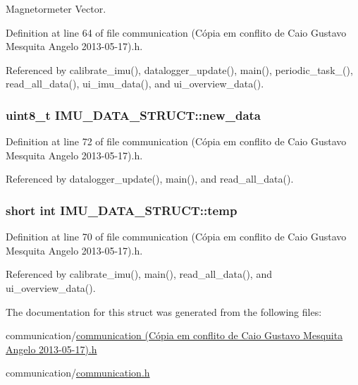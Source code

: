 Magnetormeter Vector. 



Definition at line 64 of file communication (\-Cópia em conflito de Caio Gustavo Mesquita Angelo 2013-\/05-\/17).\-h.



Referenced by calibrate\-\_\-imu(), datalogger\-\_\-update(), main(), periodic\-\_\-task\-\_(), read\-\_\-all\-\_\-data(), ui\-\_\-imu\-\_\-data(), and ui\-\_\-overview\-\_\-data().

\hypertarget{structIMU__DATA__STRUCT_a99924252176326418863e511d4fa437b}{
\subsubsection[{new\-\_\-data}]{\setlength{\rightskip}{0pt plus 5cm}uint8\-\_\-t I\-M\-U\-\_\-\-D\-A\-T\-A\-\_\-\-S\-T\-R\-U\-C\-T\-::new\-\_\-data}}\label{structIMU__DATA__STRUCT_a99924252176326418863e511d4fa437b}


Definition at line 72 of file communication (\-Cópia em conflito de Caio Gustavo Mesquita Angelo 2013-\/05-\/17).\-h.



Referenced by datalogger\-\_\-update(), main(), and read\-\_\-all\-\_\-data().

\hypertarget{structIMU__DATA__STRUCT_a81e1dbf765c1d947ca6076aa1bbc73e7}{
\subsubsection[{temp}]{\setlength{\rightskip}{0pt plus 5cm}short int I\-M\-U\-\_\-\-D\-A\-T\-A\-\_\-\-S\-T\-R\-U\-C\-T\-::temp}}\label{structIMU__DATA__STRUCT_a81e1dbf765c1d947ca6076aa1bbc73e7}


Definition at line 70 of file communication (\-Cópia em conflito de Caio Gustavo Mesquita Angelo 2013-\/05-\/17).\-h.



Referenced by calibrate\-\_\-imu(), main(), read\-\_\-all\-\_\-data(), and ui\-\_\-overview\-\_\-data().



The documentation for this struct was generated from the following files\-:\begin{DoxyCompactItemize}
\item 
communication/\hyperlink{communication_01_07C_xC3_xB3pia_01em_01conflito_01de_01Caio_01Gustavo_01Mesquita_01Angelo_012013-05-17_08_8h}{communication (\-Cópia em conflito de Caio Gustavo Mesquita Angelo 2013-\/05-\/17).\-h}\item 
communication/\hyperlink{communication_2communication_8h}{communication.\-h}\end{DoxyCompactItemize}
